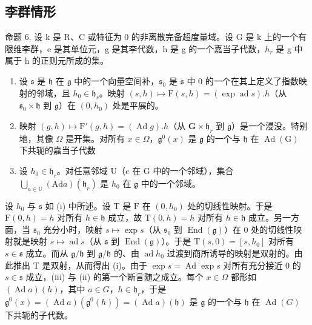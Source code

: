 \subsection{李群情形}

命题 6. 设 k 是 R、C 或特征为 0 的非离散完备超度量域。设 G 是 k 上的一个有限维李群，e 是其单位元，g 是其李代数，h 是 g 的一个嘉当子代数，\(h_{r}\) 是 g 中属于 h 的正则元所成的集。

\begin{enumerate}
\def\labelenumi{(\roman{enumi})}
\item
  设 \(\mathfrak{s}\) 是 \(\mathfrak{h}\) 在 \(\mathfrak{g}\) 中的一个向量空间补，\(\mathfrak{s}_0\) 是 \(\mathfrak{s}\) 中 0 的一个在其上定义了指数映射的邻域，且 \(h_0 \in \mathfrak{h}_r\)。映射 \((s, h) \mapsto \mathrm{F}(s, h) = (\exp \operatorname{ad} s).h\)（从 \(\mathfrak{s}_0 \times \mathfrak{h}\) 到 \(\mathfrak{g}\)）在 \((0, h_0)\) 处是平展的。
\item
  映射 \((g,h)\mapsto \mathrm{F}'(g,h) = (\operatorname {Ad}g).h\)（从 \(\mathbf{G}\times \mathfrak{h}_r\) 到 \(\mathfrak{g}\)）是一个浸没。特别地，其像 \(\Omega\) 是开集。对所有 \(x\in \Omega\)，\(\mathfrak{g}^0 (x)\) 是 \(\mathfrak{g}\) 的一个与 \(\mathfrak{h}\) 在 \(\operatorname {Ad}(\mathrm{G})\) 下共轭的嘉当子代数
\item
  设 \(h_0 \in \mathfrak{h}_r\)。对任意邻域 \(\mathrm{U}\)（\(e\) 在 \(\mathrm{G}\) 中的一个邻域），集合 \(\bigcup_{a \in \mathrm{U}} (\mathrm{Ad}a)(\mathfrak{h}_r)\) 是 \(h_0\) 在 \(\mathfrak{g}\) 中的一个邻域。
\end{enumerate}

设 \(h_0\) 与 \(\mathfrak{s}\) 如 (i) 中所述。设 \(\mathrm{T}\) 是 \(\mathrm{F}\) 在 \((0, h_0)\) 处的切线性映射。于是 \(\mathrm{F}(0, h) = h\) 对所有 \(h \in \mathfrak{h}\) 成立，故 \(\mathrm{T}(0, h) = h\) 对所有 \(h \in \mathfrak{h}\) 成立。另一方面，当 \(\mathfrak{s}_0\) 充分小时，映射 \(s \mapsto \exp s\)（从 \(\mathfrak{s}_0\) 到 \(\operatorname{End}(\mathfrak{g})\)）在 0 处的切线性映射就是映射 \(s \mapsto \operatorname{ad}s\)（从 \(\mathfrak{s}\) 到 \(\operatorname{End}(\mathfrak{g})\)）。于是 \(\mathrm{T}(s, 0) = [s, h_0]\) 对所有 \(s \in \mathfrak{s}\) 成立。而从 \(\mathfrak{g}/\mathfrak{h}\) 到 \(\mathfrak{g}/\mathfrak{h}\) 的、由 \(\operatorname{ad}h_0\) 过渡到商所诱导的映射是双射的。由此推出 \(\mathrm{T}\) 是双射，从而得出 (i)。由于 \(\exp s = \operatorname{Ad}\exp s\) 对所有充分接近 0 的 \(s \in \mathfrak{s}\) 成立，(iii) 与 (ii) 的第一个断言随之成立。每个 \(x \in \Omega\) 都形如 \((\operatorname{Ad}a)(h)\)，其中 \(a \in G\)，\(h \in \mathfrak{h}_r\)，于是 \(\mathfrak{g}^0(x) = (\operatorname{Ad}a)(\mathfrak{g}^0(h)) = (\operatorname{Ad}a)(\mathfrak{h})\) 是 \(\mathfrak{g}\) 的一个与 \(\mathfrak{h}\) 在 \(\operatorname{Ad}(G)\) 下共轭的子代数。

